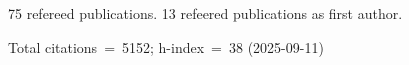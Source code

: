 75 refereed publications. 13 refeered publications as first author.

Total citations~=~5152; h-index~=~38 (2025-09-11)